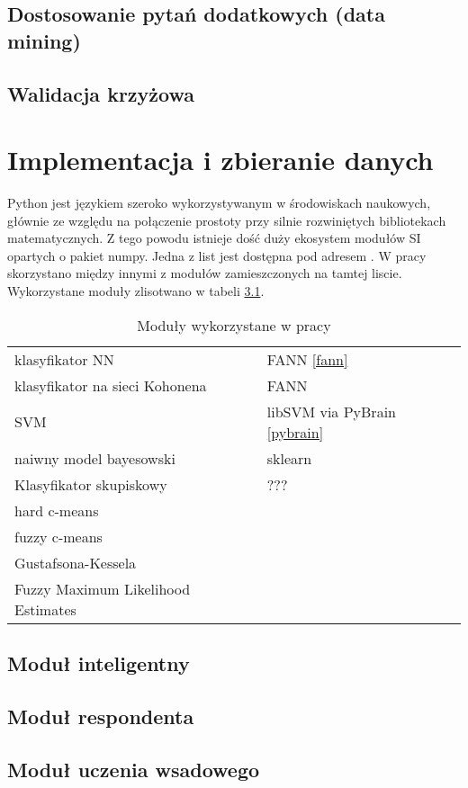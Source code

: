 \documentclass[12pt,a4paper,oneside]{report} %
\begin{document}
\section{Dostosowanie pytań dodatkowych (data mining)}
\section{Walidacja krzyżowa}
\chapter{Implementacja i zbieranie danych}
Python jest językiem szeroko wykorzystywanym w środowiskach naukowych, głównie ze względu na połączenie prostoty przy silnie rozwiniętych bibliotekach matematycznych. Z tego powodu istnieje dość duży ekosystem modułów SI opartych o pakiet numpy. Jedna z list jest dostępna pod adresem \cite{pythonwiki}. W pracy skorzystano między innymi z modułów zamieszczonych na tamtej liscie. Wykorzystane moduły zlisotwano w tabeli \ref{table:modules}.\par

\begin{table}
\centering
\begin{tabular}{|l|l|}
\toprule
klasyfikator NN & FANN \ref{fann}\\
    klasyfikator na sieci Kohonena & FANN\\
    SVM & libSVM via PyBrain \ref{pybrain}\\
    naiwny model bayesowski & sklearn \\
    Klasyfikator skupiskowy & ??? \\
    hard c-means &  \\
    fuzzy c-means & \\
    Gustafsona-Kessela & \\
    Fuzzy Maximum Likelihood Estimates & \\
\bottomrule
\end{tabular}
\label{table:modules}
\caption{Moduły wykorzystane w pracy}
\end{table}
\section{Moduł inteligentny}
\section{Moduł respondenta}
\section{Moduł uczenia wsadowego}
\end{document}
